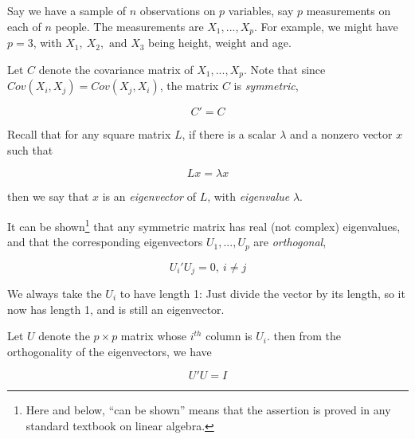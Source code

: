 Say we have a sample of $n$ observations on $p$ variables, say $p$
measurements on each of $n$ people.  The measurements are $X_1,...,X_p$.
For example, we might have $p=3$, with $X_1, ~ X_2, \textrm{ and } X_3$
being height, weight and age.  

% 
% 
% 

Let $C$ denote the covariance matrix of $X_1,...,X_p$.  Note that
since $Cov(X_i,X_j) = Cov(X_j,X_i)$, 
the matrix $C$ is \emph{symmetric},

\begin{equation}
C' = C
\end{equation}

Recall that for any square matrix $L$, if there is a scalar $\lambda$
and a nonzero vector $x$ such that 

\begin{equation}
Lx = \lambda x
\end{equation}

then we say that $x$ is an \textit{eigenvector} of $L$, with
\textit{eigenvalue} $\lambda$.  

It can be shown\footnote{Here and below, ``can be shown'' means that the
assertion is proved in any standard textbook on linear algebra.} that
any symmetric matrix has real (not complex) eigenvalues, and that the
corresponding eigenvectors $U_1,...,U_p$ are \textit{orthogonal},

\begin{equation}
U_i' U_j = 0, ~ i \neq j
\end{equation}

We always take the $U_i$ to have length 1:  Just divide the vector by
its length, so it now has length 1, and is still an eigenvector.  

Let $U$ denote the $p \times p$ matrix whose $i^{th}$ column is $U_i$.
then from the orthogonality of the eigenvectors, we have

\begin{equation}
\label{uui}
U'U = I
\end{equation}


